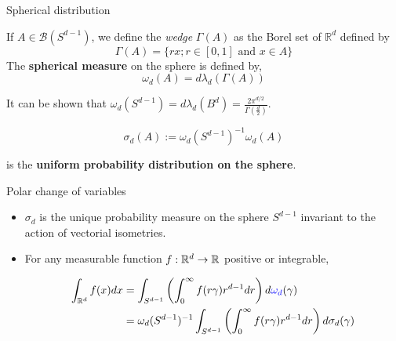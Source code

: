 \documentclass{beamer}
\begin{document}
  \begin{frame}{Spherical distribution}

    \begin{definition}
      If $A \in \mathcal{B}\left(S^{d-1}\right)$, we define the \emph{wedge}
      $\Gamma(A)$ as the Borel set
      of $\mathbb{R}^{d}$ defined by
      $$
      \Gamma(A)=\{r x ; r \in[0,1] \text { and } x \in A\}
      $$
      The \textbf{spherical measure} on the sphere is defined by,
      $$
      \omega_{d}(A)=d \lambda_{d}(\Gamma(A))
      $$
    \end{definition}

    \pause

    It can be shown that $\omega_d(S^{d-1}) = d\lambda_d(B^d)  = \frac{2 \pi^{d /
        2}}{\Gamma\left(\frac{d}{2}\right)} $.

    \begin{equation*}
      \sigma_{d}(A):= \omega_d(S^{d-1})^{-1} \omega_d(A)
    \end{equation*}

    is the \textbf{uniform probability distribution on the sphere}.

  \end{frame}

  \begin{frame}{Polar change of variables}
    \begin{theorem}
      \begin{itemize}
      \item $\sigma_{d}$ is the unique probability measure on the sphere
        $S^{d-1}$ invariant to the action of vectorial isometries.

        \pause

      \item For any measurable function $f: \mathbb{R}^{d} \to \mathbb{R}$ positive or integrable,

        \begin{equation*}
          \begin{aligned}
            \int_{\mathbb{R}^{d}} f(x) d x &=\int_{S^{d-1}}\left(\int_{0}^{\infty} f(r \gamma) r^{d-1} d r\right) d \textcolor{blue}{\omega_d}(\gamma) \\  &= \omega_d(S^{d-1})^{-1} \int_{S^{d-1}}\left(\int_{0}^{\infty} f(r \gamma) r^{d-1} d r\right) d \sigma_d(\gamma)
          \end{aligned}
        \end{equation*}


      \end{itemize}

    \end{theorem}

  \end{frame}
\end{document}
